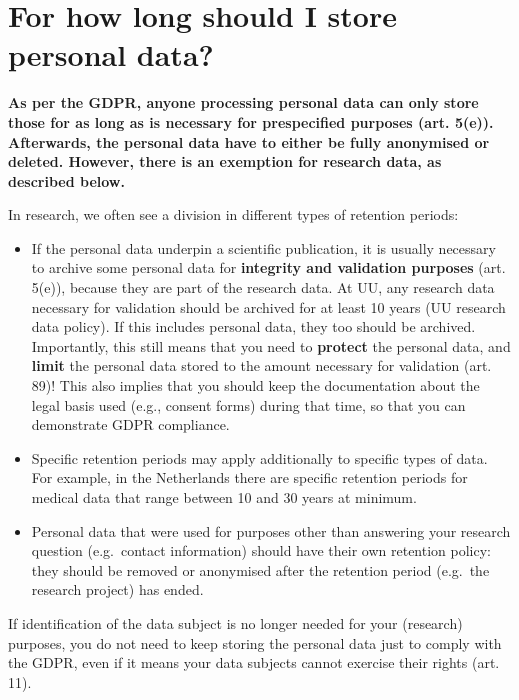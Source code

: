 \documentclass[
]{book}
\providecommand{\tightlist}{%
  \setlength{\itemsep}{0pt}\setlength{\parskip}{0pt}}
\begin{document}
\hypertarget{data-storage-duration}{%
\section{For how long should I store personal data?}\label{data-storage-duration}}

\textbf{As per the GDPR, anyone processing personal data can only store those for as
long as is necessary for prespecified purposes
(art. 5(e)).
Afterwards, the personal data have to either be fully anonymised or deleted.
However, there is an exemption for research data, as described below.}

In research, we often see a division in different types of retention periods:

\begin{itemize}
\tightlist
\item
  If the personal data underpin a scientific publication, it is usually necessary
  to archive some personal data for \textbf{integrity and validation purposes}
  (art. 5(e)),
  because they are part of the research data. At UU, any research data necessary
  for validation should be archived for at least 10 years
  (UU research data policy).
  If this includes personal data, they too should be archived. Importantly, this
  still means that you need to \textbf{protect} the personal data, and \textbf{limit} the personal
  data stored to the amount necessary for validation
  (art. 89)!
  This also implies that you should keep the documentation about the legal basis
  used (e.g., consent forms) during that time, so that you can demonstrate GDPR
  compliance.
\item
  Specific retention periods may apply additionally to specific types of data.
  For example, in the Netherlands there are specific retention periods for medical data that range between 10 and
  30 years at minimum.
\item
  Personal data that were used for purposes other than answering your
  research question (e.g.~contact information) should have their own retention
  policy: they should be removed or anonymised after the retention period
  (e.g.~the research project) has ended.
\end{itemize}

If identification of the data subject is no longer needed for your
(research) purposes, you do not need to keep storing the personal data just
to comply with the GDPR, even if it means your data subjects cannot exercise
their rights (art. 11).
\end{document}
